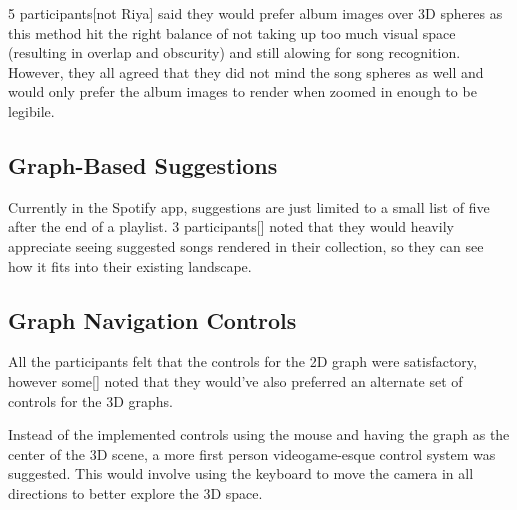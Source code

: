 5 participants[not Riya] said they would prefer album images over 3D spheres as this method hit the right balance of not taking up too much visual space (resulting in overlap and obscurity) and still alowing for song recognition. However, they all agreed that they did not mind the song spheres as well and would only prefer the album images to render when zoomed in enough to be legibile.

\subsection{Graph-Based Suggestions}
Currently in the Spotify app, suggestions are just limited to a small list of five after the end of a playlist. 3 participants[] noted that they would heavily appreciate seeing suggested songs rendered in their collection, so they can see how it fits into their existing landscape.

\subsection{Graph Navigation Controls}
All the participants felt that the controls for the 2D graph were satisfactory, however some[] noted that they would've also preferred an alternate set of controls for the 3D graphs.

Instead of the implemented controls using the mouse and having the graph as the center of the 3D scene, a more first person videogame-esque control system was suggested. This would involve using the keyboard to move the camera in all directions to better explore the 3D space.